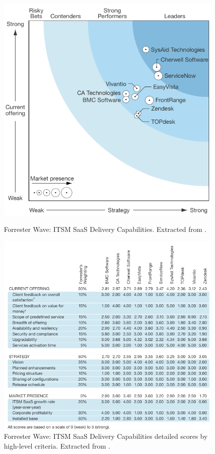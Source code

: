 \begin{figure}[h]
\begin{minipage}[h]{0.40\linewidth}
\centering
\includegraphics[width=\textwidth]{img/ForresterWaveITSM.png}
\caption{Forrester Wave: ITSM SaaS Delivery Capabilities. Extracted from \cite{forresterWaveITSM}.}
\label{fig:figure1}
\end{minipage}
\hspace{0.5cm}
\begin{minipage}[h]{0.60\linewidth}
\centering
\includegraphics[width=\textwidth]{img/ITSMForrScores.png}
\caption{Forrester Wave: ITSM SaaS Delivery Capabilities detailed scores by high-level criteria. Extracted from \cite{forresterWaveITSM}.}
\label{fig:figure2}
\end{minipage}
\end{figure}

